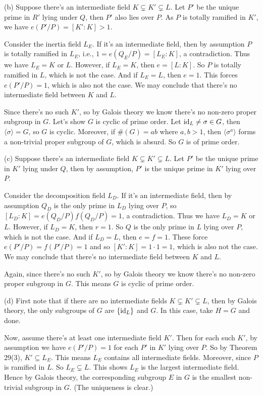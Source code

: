 \documentclass[../Marcus.tex]{subfiles}
\begin{document}
(b) Suppose there's an intermediate field $K\varsubsetneq K'\varsubsetneq L$. Let $P'$ be the unique prime in $R'$ lying under $Q$, then $P'$ also lies over $P$. As $P$ is totally ramified in $K'$, we have $e(P'/P)=[K':K]>1$.

Consider the inertia field $L_E$. If it's an intermediate field, then by assumption $P$ is totally ramified in $L_E$, i.e., $1=e(Q_E/P)=[L_E:K]$, a contradiction. Thus we have $L_E=K$ or $L$. However, if $L_E=K$, then $e=[L:K]$. So $P$ is totally ramified in $L$, which is not the case. And if $L_E=L$, then $e=1$. This forces $e(P'/P)=1$, which is also not the case. We may conclude that there's no intermediate field between $K$ and $L$.

Since there's no such $K'$, so by Galois theory we know there's no non-zero proper subgroup in $G$. Let's show $G$ is cyclic of prime order. Let $\operatorname{id}_L\neq\sigma\in G$, then $\langle\sigma\rangle=G$, so $G$ is cyclic. Moreover, if $\#(G)=ab$ where $a,b>1$, then $\langle\sigma^a\rangle$ forms a non-trivial proper subgroup of $G$, which is absurd. So $G$ is of prime order.

(c) Suppose there's an intermediate field $K\varsubsetneq K'\varsubsetneq L$. Let $P'$ be the unique prime in $K'$ lying under $Q$, then by assumption, $P'$ is the unique prime in $K'$ lying over $P$.

Consider the decomposition field $L_D$. If it's an intermediate field, then by assumption $Q_D$ is the only prime in $L_D$ lying over $P$, so $[L_D:K]=e(Q_D/P)f(Q_D/P)=1$, a contradiction. Thus we have $L_D=K$ or $L$. However, if $L_D=K$, then $r=1$. So $Q$ is the only prime in $L$ lying over $P$, which is not the case. And if $L_D=L$, then $e=f=1$. These force $e(P'/P)=f(P'/P)=1$ and so $[K':K]=1\cdot 1=1$, which is also not the case. We may conclude that there's no intermediate field between $K$ and $L$.

Again, since there's no such $K'$, so by Galois theory we know there's no non-zero proper subgroup in $G$. This means $G$ is cyclic of prime order.

(d) First note that if there are no intermediate fields $K\varsubsetneq K'\varsubsetneq L$, then by Galois theory, the only subgroups of $G$ are $\{\operatorname{id}_L\}$ and $G$. In this case, take $H=G$ and done.

Now, assume there's at least one intermediate field $K'$. Then for each such $K'$, by assumption we have $e(P'/P)=1$ for each $P'$ in $K'$ lying over $P$. So by Theorem 29(3), $K'\subseteq L_E$. This means $L_E$ contains all intermediate fields. Moreover, since $P$ is ramified in $L$. So $L_E\varsubsetneq L$. This shows $L_E$ is the largest intermediate field. Hence by Galois theory, the corresponding subgroup $E$ in $G$ is the smallest non-trivial subgroup in $G$. (The uniqueness is clear.)
\end{document}
